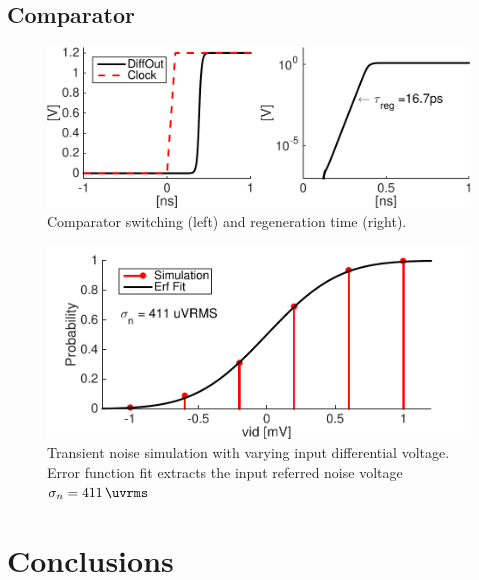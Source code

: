 \documentclass[10pt,journal]{IEEEtran}\usepackage{longtable}
\begin{document}
\subsection{Comparator}
\begin{figure}[tbph]
\begin{center}
\includegraphics[width=1\columnwidth]{Comparator_Result_Reg_Time.pdf}
\caption{Comparator switching (left) and regeneration time (right).}
\label{fig:ComparatorRegTime}
\end{center}
\end{figure}
\begin{figure}[tbph]
\begin{center}
\includegraphics[width=1\columnwidth]{ComparatorTranNoise.pdf}
\caption{Transient noise simulation with varying input differential voltage. Error function fit extracts the input referred noise voltage $\sigma_{n}=\SI{411}{\uvrms}$}
\label{fig:ComparatorTranNoise}
\end{center}
\end{figure}

\section{Conclusions}
\lipsum[5]






\end{document}
